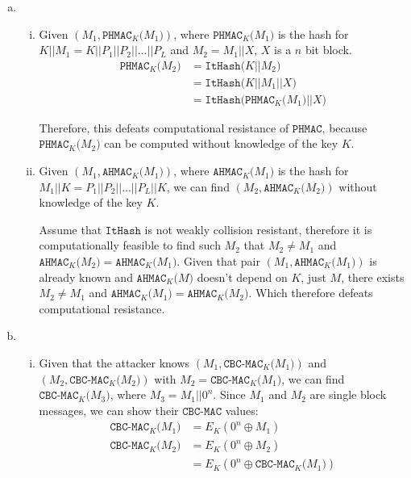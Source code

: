 \documentclass[11pt]{article}
\def\c#1{\texttt{#1}}
\def\ithash#1{\c{ItHash(}#1\c{)}}
\def\phmac#1{\c{PHMAC}_K\c{(}#1\c{)}}
\def\ahmac#1{\c{AHMAC}_K\c{(}#1\c{)}}
\def\cbcmac#1{\c{CBC-MAC}_K\c{(}#1\c{)}}
\theoremstyle{definition}
\begin{document}
\begin{enumerate}[a. ]
  \item
    \begin{enumerate}[i. ]
      \item Given $(M_1, \phmac{M_1})$, where $\phmac{M_1}$ is the hash for $K||M_1 = K||P_1||P_2|| \ldots ||P_L$ and $M_2 = M_1||X$, $X$ is a $n$ bit block.
        \begin{align*}
          \phmac{M_2} &= \ithash{K||M_2} \\
                      &= \ithash{K||M_1||X} \\
                      &= \ithash{\phmac{M_1}||X}
        \end{align*}

        Therefore, this defeats computational resistance of $\c{PHMAC}$, because $\phmac{M_2}$ can be computed without knowledge of the key $K$.

      \item Given $(M_1, \ahmac{M_1})$, where $\ahmac{M_1}$ is the hash for $M_1||K = P_1||P_2|| \ldots ||P_L||K$, we can find $(M_2, \ahmac{M_2})$ without knowledge of the key $K$.

        Assume that $\c{ItHash}$ is not weakly collision resistant, therefore it is computationally feasible to find such $M_2$ that $M_2 \neq M_1$ and $\ahmac{M_2} = \ahmac{M_1}$. Given that pair $(M_1, \ahmac{M_1})$ is already known and $\ahmac{M}$ doesn't depend on $K$, just $M$, there exists $M_2 \neq M_1$ and $\ahmac{M_1} = \ahmac{M_2}$. Which therefore defeats computational resistance.
    \end{enumerate}

  \item
    \begin{enumerate}[i. ]
      \item Given that the attacker knows $(M_1, \cbcmac{M_1})$ and $(M_2, \cbcmac{M_2})$ with $M_2 = \cbcmac{M_1}$, we can find $\cbcmac{M_3}$, where $M_3 = M_1||0^n$. Since $M_1$ and $M_2$ are single block messages, we can show their $\c{CBC-MAC}$ values:
          \begin{align*}
            \cbcmac{M_1} &= E_K(0^n \oplus M_1) \\
            \cbcmac{M_2} &= E_K(0^n \oplus M_2) \\
                         &= E_K(0^n \oplus \cbcmac{M_1})
          \end{align*}


\end{enumerate}
\end{enumerate}
\end{document}
